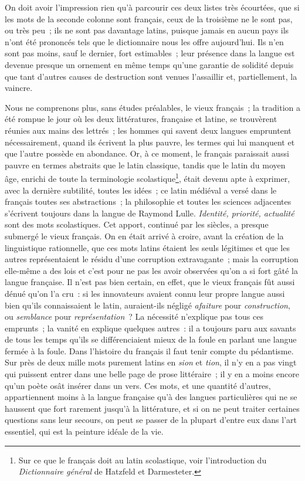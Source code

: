 \documentclass[french,twoside]{book} %
\begin{document}
\noindent On doit avoir l’impression rien qu’à parcourir ces deux listes très écourtées, que si les mots de la seconde colonne sont français, ceux de la troisième ne le sont pas, ou très peu ; ils ne sont pas davantage latins, puisque jamais en aucun pays ils n’ont été prononcés tels que le dictionnaire nous les offre aujourd’hui. Ils n’en sont pas moins, sauf le dernier, fort estimables ; leur présence dans la langue est devenue presque un ornement en même temps qu’une garantie de solidité depuis que tant d’autres causes de destruction sont venues l’assaillir et, partiellement, la vaincre.\par
Nous ne comprenons plus, sans études préalables, le vieux français ; la tradition a été rompue le jour où les deux littératures, française et latine, se trouvèrent réunies aux mains des lettrés ; les hommes qui savent deux langues empruntent nécessairement, quand ils écrivent la plus pauvre, les termes qui lui manquent et que l’autre possède en abondance. Or, à ce moment, le français paraissait aussi pauvre en termes abstraits que le latin classique, tandis que le latin du moyen âge, enrichi de toute la terminologie scolastique\footnote{Sur ce que le français doit au latin scolastique, voir l’introduction du {\itshape Dictionnaire général} de Hatzfeld et Darmesteter.}, était devenu apte à exprimer, avec la dernière subtilité, toutes les idées ; ce latin médiéval a versé dans le français toutes ses abstractions ; la philosophie et toutes les sciences adjacentes s’écrivent toujours dans la langue de Raymond Lulle. {\itshape Identité, priorité, actualité} sont des mots scolastiques. Cet apport, continué par les siècles, a presque submergé le vieux français. On en était arrivé à croire, avant la création de la linguistique rationnelle, que ces mots latins étaient les seuls légitimes et que les autres représentaient le résidu d’une corruption extravagante ; mais la corruption elle-même a des lois et c’est pour ne pas les avoir observées qu’on a si fort gâté la langue française. Il n’est pas bien certain, en effet, que le vieux français fût aussi dénué qu’on l’a cru : si les innovateurs avaient connu leur propre langue aussi bien qu’ils connaissaient le latin, auraient-ils négligé {\itshape afaiture} pour {\itshape construction}, ou {\itshape semblance} pour {\itshape représentation} ? La nécessité n’explique pas tous ces emprunts ; la vanité en explique quelques autres : il a toujours paru aux savants de tous les temps qu’ils se différenciaient mieux de la foule en parlant une langue fermée à la foule. Dans l’histoire du français il faut tenir compte du pédantisme. Sur près de deux mille mots purement latins en {\itshape sion} et {\itshape tion}, il n’y en a pas vingt qui puissent entrer dans une belle page de prose littéraire ; il y en a moins encore qu’un poète osât insérer dans un vers. Ces mots, et une quantité d’autres, appartiennent moins à la langue française qu’à des langues particulières qui ne se haussent que fort rarement jusqu’à la littérature, et si on ne peut traiter certaines questions sans leur secours, on peut se passer de la plupart d’entre eux dans l’art essentiel, qui est la peinture idéale de la vie.\par
\end{document}
